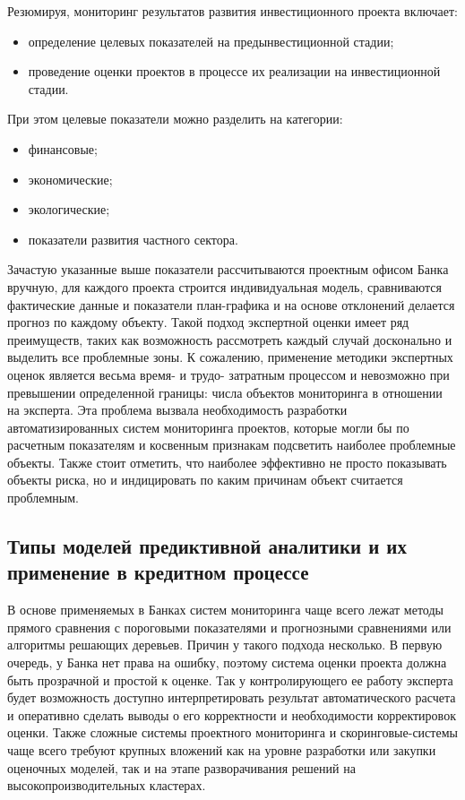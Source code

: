 \documentclass[12pt,a4paper]{article} %
\begin{document}
Резюмируя, мониторинг результатов развития инвестиционного проекта включает:
\begin{itemize}
	\item определение целевых показателей на предынвестиционной стадии;
	\item проведение оценки проектов в процессе их реализации на инвестиционной стадии.
\end{itemize}

При этом целевые показатели можно разделить на категории:
\begin{itemize}
	\item финансовые;
	\item экономические;
	\item экологические;
	\item показатели развития частного сектора.
\end{itemize}

Зачастую указанные выше показатели рассчитываются проектным офисом Банка вручную, для каждого проекта строится индивидуальная модель, сравниваются фактические данные и показатели план-графика и на основе отклонений делается прогноз по каждому объекту. Такой подход экспертной оценки имеет ряд преимуществ, таких как возможность рассмотреть каждый случай досконально и выделить все проблемные зоны. К сожалению, применение методики экспертных оценок является весьма время- и трудо- затратным процессом и невозможно при превышении определенной границы: числа объектов мониторинга в отношении на эксперта. Эта проблема вызвала необходимость разработки автоматизированных систем мониторинга проектов, которые могли бы по расчетным показателям и косвенным признакам подсветить наиболее проблемные объекты. Также стоит отметить, что наиболее эффективно не просто показывать объекты риска, но и индицировать по каким причинам объект считается проблемным. 

\subsection{Типы моделей предиктивной аналитики и их применение в кредитном процессе}

В основе применяемых в Банках систем мониторинга чаще всего лежат методы прямого сравнения с пороговыми показателями и прогнозными сравнениями или алгоритмы решающих деревьев. Причин у такого подхода несколько. В первую очередь, у Банка нет права на ошибку, поэтому система оценки проекта должна быть прозрачной и простой к оценке. Так у контролирующего ее работу эксперта будет возможность доступно интерпретировать результат автоматического расчета и оперативно сделать выводы о его корректности и необходимости корректировок оценки. Также сложные системы проектного мониторинга и  скоринговые-системы чаще всего требуют крупных вложений как на уровне разработки или закупки оценочных моделей, так и на этапе разворачивания решений на высокопроизводительных кластерах.
\end{document}
